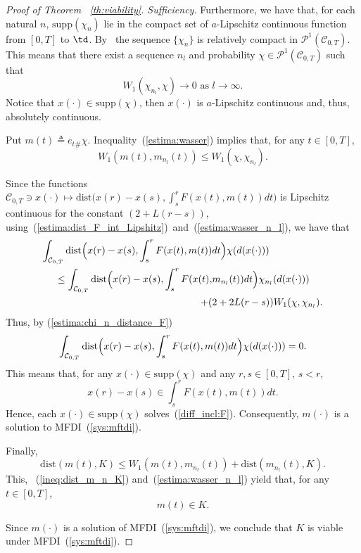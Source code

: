 \documentclass[12pt]{article}
\newcommand{\ac}[2]{\mathcal{C}_{{#1},{#2}}}
\newcommand{\pc}[2]{\mathcal{P}^1(\mathcal{C}_{{#1},{#2}})}
\begin{document}
\begin{proof}[Proof of Theorem ~\ref{th:viability}. Sufficiency]
Furthermore, we have that, for each natural $n$, $\mathrm{supp}(\chi_n)$ lie in the compact set of $a$-Lipschitz continuous function from $[0,T]$ to $\td$. By~\cite[Proposition 7.1.5]{Ambrosio} the sequence $\{\chi_n\}$ is relatively compact in $\pc{0}{T}$. This means that there exist a sequence $n_l$ and probability $\chi\in\pc{0}{T}$ such that 
$$W_1(\chi_{n_l},\chi)\rightarrow 0\mbox{ as }l\rightarrow \infty. $$  
Notice that $x(\cdot)\in \mathrm{supp}(\chi)$, then $x(\cdot)$ is $a$-Lipschitz continuous and, thus, absolutely continuous.

Put $m(t)\triangleq e_t{}_\#\chi$. Inequality~(\ref{estima:wasser}) implies that, for any $t\in [0,T]$,
\begin{equation}\label{estima:wasser_n_l}
W_1(m(t),m_{n_l}(t))\leq W_1(\chi,\chi_{n_l}). 
\end{equation}

Since the functions $\mathcal{C}_{0,T}\ni x(\cdot)\mapsto \mathrm{dist}\bigl(x(r)-x(s),\int_s^rF(x(t),m(t))dt\bigr)$ is Lipschitz continuous for the constant $(2+L(r-s))$, using~(\ref{estima:dist_F_int_Lipshitz})~and~(\ref{estima:wasser_n_l}),  we have that
\begin{equation*}
\begin{split}
\int_{\ac{0}{T}}\mathrm{dist}\Bigl(x(r)-x(s),\int_s^rF(x(t),m(t))&dt\Bigr)\chi(d(x(\cdot)))\\ \leq 
\int_{\ac{0}{T}}\mathrm{dist}\Bigl(x(r)-x(s),\int_s^rF(x(t),&m_{n_l}(t))dt\Bigr)\chi_{n_l}(d(x(\cdot)))\\+ (&2+2L(r-s))W_1(\chi,\chi_{n_l}).
\end{split}\end{equation*}
Thus, by (\ref{estima:chi_n_distance_F}) $$\int_{\ac{0}{T}}\mathrm{dist}\Bigl(x(r)-x(s),\int_s^rF(x(t),m(t))dt\Bigr)\chi(d(x(\cdot)))=0. $$ This means that, for any $x(\cdot)\in\mathrm{supp}(\chi)$ and any $r,s\in [0,T]$, $s<r$, $$x(r)-x(s)\in \int_s^rF(x(t),m(t))dt.$$ Hence, each  $x(\cdot)\in\mathrm{supp}(\chi)$ solves~(\ref{diff_incl:F}). Consequently, $m(\cdot)$ is a solution to MFDI~(\ref{sys:mftdi}).

Finally,
$$\mathrm{dist}(m(t),K)\leq W_1(m(t),m_{n_l}(t))+\mathrm{dist}(m_{n_l}(t),K). $$
This, ~(\ref{ineq:dist_m_n_K}) and~(\ref{estima:wasser_n_l}) yield that, for any $t\in [0,T]$,
$$m(t)\in K. $$

Since $m(\cdot)$ is a solution of MFDI~(\ref{sys:mftdi}), we conclude that $K$ is viable under MFDI~(\ref{sys:mftdi}). \end{proof}
\end{document}
